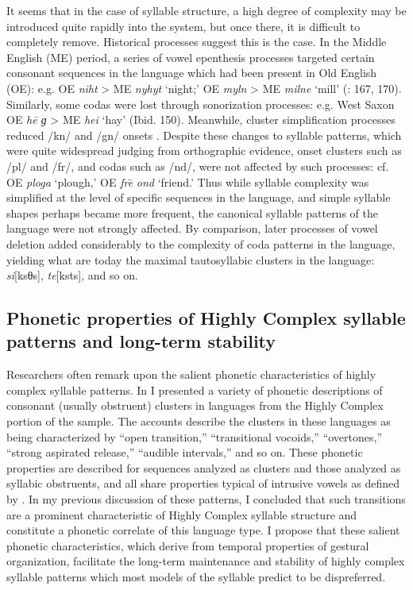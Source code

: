   It seems that in the case of syllable structure, a high degree of complexity may be introduced quite rapidly into the system, but once there, it is difficult to completely remove. Historical processes suggest this is the case. In the Middle English (ME) period, a series of vowel epenthesis processes targeted certain consonant sequences in the language which had been present in Old English (OE): e.g. OE \textit{niht} > ME \textit{nyhyt} ‘night;’ OE \textit{myln} > ME \textit{milne} ‘mill’ (\citealt{Jones1989}: 167, 170). Similarly, some codas were lost through sonorization processes: e.g. West Saxon OE \textit{he\={} ɡ} > ME \textit{hei} ‘hay’ (Ibid. 150). Meanwhile, cluster simplification processes reduced /kn/ and /gn/ onsets \citep{Minkova2003}. Despite these changes to syllable patterns, which were quite widespread judging from orthographic evidence, onset clusters such as /pl/ and /fr/, and codas such as /nd/, were not affected by such processes: cf. OE \textit{ploga} ‘plough,’ OE \textit{fre}\textsf{\={} }\textit{ond} ‘friend.’ Thus while syllable complexity was simplified at the level of specific sequences in the language, and simple syllable shapes perhaps became more frequent, the canonical syllable patterns of the language were not strongly affected. By comparison, later processes of vowel deletion added considerably to the complexity of coda patterns in the language, yielding what are today the maximal tautosyllabic clusters in the language: \textit{si}[ksθs], \textit{te}[ksts], and so on.

\subsection{Phonetic properties of Highly Complex syllable patterns and long-term stability}\label{sec:8.5.3}

  Researchers often remark upon the salient phonetic characteristics of highly complex syllable patterns. In  I presented a variety of phonetic descriptions of consonant (usually obstruent) clusters in languages from the Highly Complex portion of the sample. The accounts describe the clusters in these languages as being characterized by ``open transition,'' ``transitional vocoids,'' ``overtones,'' ``strong aspirated release,'' ``audible intervals,'' and so on. These phonetic properties are described for sequences analyzed as clusters and those analyzed as syllabic obstruents, and all share properties typical of intrusive vowels as defined by \citet{Hall2006}. In my previous discussion of these patterns, I concluded that such transitions are a prominent characteristic of Highly Complex syllable structure and constitute a phonetic correlate of this language type. I propose that these salient phonetic characteristics, which derive from temporal properties of gestural organization, facilitate the long-term maintenance and stability of highly complex syllable patterns which most models of the syllable predict to be dispreferred.

